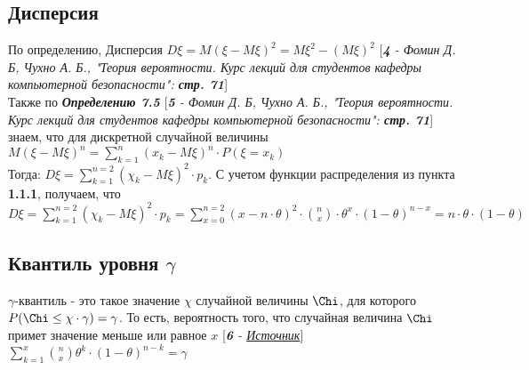 \documentclass[14pt,a4paper,oneside]{extbook}
\begin{document}
	\subsection{Дисперсия}
	По определению, Дисперсия $D\xi = M(\xi - M\xi)^2 = M\xi^2 - (M\xi)^2$ [\textit{\textbf{4} - Фомин Д. Б, Чухно А. Б., "Теория вероятности. Курс лекций для студентов кафедры компьютерной безопасности": \textbf{стр. 71}}] \\
	Также по \textit{\textbf{Определению 7.5}} [\textit{\textbf{5} - Фомин Д. Б, Чухно А. Б., "Теория вероятности. Курс лекций для студентов кафедры компьютерной безопасности": \textbf{стр. 71}}] знаем, что для дискретной случайной величины \\
	$\displaystyle M(\xi - M\xi)^{n} = \displaystyle\sum_{k=1}^{n}(x_k - M\xi)^{n} \cdot P(\xi = x_k)$ \\
	Тогда: $D\xi = \displaystyle\sum_{k = 1}^{n=2}(\chi_k - M\xi)^2 \cdot p_k$. С учетом функции распределения из пункта \textbf{1.1.1}, получаем, что \\
	$D\xi = \displaystyle\sum_{k = 1}^{n=2}(\chi_k - M\xi)^2 \cdot p_k = \displaystyle\sum_{x=0}^{n=2}(x - n \cdot \theta)^{2} \cdot \binom{n}{x} \cdot \theta^{x} \cdot (1 - \theta)^{n - x} = n \cdot \theta \cdot (1 - \theta)$
	
	\subsection{Квантиль уровня $\gamma$}
	$\gamma$-квантиль - это такое значение $\chi$ случайной величины $\Chi$, для которого $P(\Chi \leq \chi \cdot \gamma) = \gamma$. То есть, вероятность того, что случайная величина $\Chi$ примет значение меньше или равное $x$ [\textit{\textbf{6} - \href{https://allatambov.github.io/psms/pdf/quantiles.pdf}{Источник}}]\\
	$\displaystyle\sum_{k=1}^{x} \binom{n}{x} \theta^{k} \cdot (1 - \theta)^{n - k} = \gamma$
	
\end{document}
